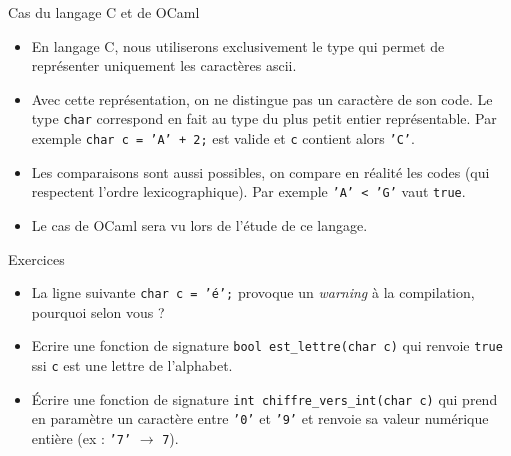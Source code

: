\documentclass[10pt]{beamer}
\begin{document}
\begin{frame}{\Ctitle}{\stitle}
	\begin{block}{Cas du langage C et de OCaml}
		\begin{itemize}
		\item<1-> En langage C, nous utiliserons exclusivement le type   qui permet de représenter \textcolor{BrickRed}{uniquement} les caractères {\sc ascii}.
		\item<2-> Avec cette représentation, on ne distingue pas un caractère de son code. Le type {\tt char} correspond en fait au type du plus petit entier représentable. Par exemple \texttt{char c = 'A' + 2;} est valide et {\tt c} contient alors \texttt{'C'}.
		\item<3-> Les comparaisons sont aussi possibles, on compare en réalité les codes (qui respectent l'ordre lexicographique). Par exemple \texttt{'A' < 'G'} vaut \texttt{true}.
		\item<4-> Le cas de OCaml sera vu lors de l'étude de ce langage.
		\end{itemize}
	\end{block}
\end{frame}
	
\begin{frame}{\Ctitle}{\stitle}
	\begin{exampleblock}{Exercices}
		\begin{itemize}
		\item La ligne suivante \texttt{char c = 'é';} provoque un \textit{warning} à la compilation, pourquoi selon vous ?
		\item Ecrire une fonction de signature \texttt{bool est_lettre(char c)} qui renvoie {\tt true} ssi {\tt c} est une lettre de l'alphabet.
		\item Écrire une fonction de signature \texttt{int chiffre_vers_int(char c)} qui prend en paramètre un caractère entre {\tt '0'} et {\tt '9'} et renvoie sa valeur numérique entière (ex : {\tt '7'} $\to$ {\tt 7}).
		\end{itemize}
	\end{exampleblock}
\end{frame}
\end{document}
